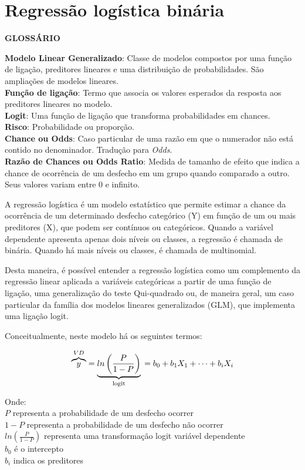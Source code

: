 \documentclass[
]{book}
\begin{document}
\hypertarget{regressuxe3o-loguxedstica-binuxe1ria}{%
\chapter{Regressão logística binária}\label{regressuxe3o-loguxedstica-binuxe1ria}}

\begin{writing}
\textbf{GLOSSÁRIO}

\textbf{Modelo Linear Generalizado}: Classe de modelos compostos por uma
função de ligação, preditores lineares e uma distribuição de
probabilidades. São ampliações de modelos lineares.\\
\textbf{Função de ligação}: Termo que associa os valores esperados da
resposta aos preditores lineares no modelo.\\
\textbf{Logit}: Uma função de ligação que transforma probabilidades em
chances.\\
\textbf{Risco}: Probabilidade ou proporção.\\
\textbf{Chance ou Odds}: Caso particular de uma razão em que o numerador
não está contido no denominador. Tradução para \emph{Odds}.\\
\textbf{Razão de Chances ou Odds Ratio}: Medida de tamanho de efeito que
indica a chance de ocorrência de um desfecho em um grupo quando
comparado a outro. Seus valores variam entre 0 e infinito.
\end{writing}

A regressão logística é um modelo estatístico que permite estimar a chance da ocorrência de um determinado desfecho categórico (Y) em função de um ou mais preditores (X), que podem ser contínuos ou categóricos. Quando a variável dependente apresenta apenas dois níveis ou classes, a regressão é chamada de binária. Quando há mais níveis ou classes, é chamada de multinomial.

Desta maneira, é possível entender a regressão logística como um complemento da regressão linear aplicada a variáveis categóricas a partir de uma função de ligação, uma generalização do teste Qui-quadrado ou, de maneira geral, um caso particular da família dos modelos lineares generalizados (GLM), que implementa uma ligação logit.

Conceitualmente, neste modelo há os seguintes termos:

\[\overbrace{y}^{VD} = \underbrace{ln\left ( \frac{P}{1-P} \right)}_\text{logit} \\= b_0+b_1X_1+ \dots + b_iX_i\]

Onde:\\
\(P\) representa a probabilidade de um desfecho ocorrer\\
\(1-P\) representa a probabilidade de um desfecho não ocorrer\\
\(ln\left ( \frac{P}{1-P} \right)\) representa uma transformação logit variável dependente\\
\(b_0\) é o intercepto\\
\(b_i\) indica os preditores
\end{document}
